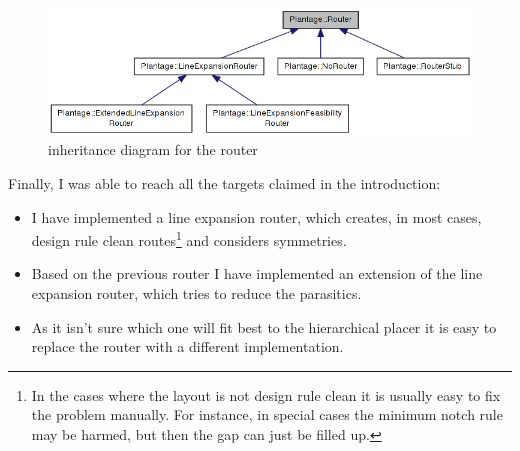 \begin{figure}
	\centering
	\includegraphics[scale=.6]{FIG/class_diagram_router.png}
  	\caption{inheritance diagram for the router}
	\label{fig:class_diagram_router}
\end{figure}

Finally, I was able to reach all the targets claimed in the introduction:
\begin{itemize}
\item I have implemented a line expansion router, which creates, in most cases, design rule clean routes\footnote{\label{foot:1}In the cases where the layout is not design rule clean it is usually easy to fix the problem manually. For instance, in special cases the minimum notch rule may be harmed, but then the gap can just be filled up.} and considers symmetries.
\item Based on the previous router I have implemented an extension of the line expansion router, which tries to reduce the parasitics.
\item As it isn't sure which one will fit best to the hierarchical placer it is easy to replace the router with a different implementation.
\end{itemize}